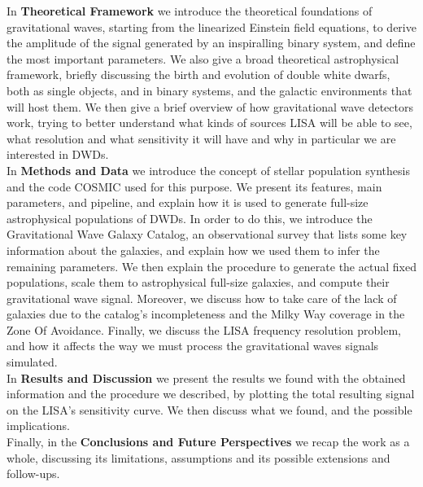 In \textbf{Theoretical Framework} we introduce the theoretical foundations of gravitational waves, starting from the linearized Einstein field equations, to derive the amplitude of the signal generated by an inspiralling binary system, and define the most important parameters.
We also give a broad theoretical astrophysical framework, briefly discussing the birth and evolution of double white dwarfs, both as single objects, and in binary systems, and the galactic environments that will host them.
We then give a brief overview of how gravitational wave detectors work, trying to better understand what kinds of sources LISA will be able to see, what resolution and what sensitivity it will have and why in particular we are interested in DWDs.
\vspace{2mm}\\
In \textbf{Methods and Data} we introduce the concept of stellar population synthesis and the code COSMIC used for this purpose.
We present its features, main parameters, and pipeline, and explain how it is used to generate full-size astrophysical populations of DWDs.
In order to do this, we introduce the Gravitational Wave Galaxy Catalog, an observational survey that lists some key information about the galaxies, and explain how we used them to infer the remaining parameters.
We then explain the procedure to generate the actual fixed populations, scale them to astrophysical full-size galaxies, and compute their gravitational wave signal. 
Moreover, we discuss how to take care of the lack of galaxies due to the catalog's incompleteness and the Milky Way coverage in the Zone Of Avoidance.
Finally, we discuss the LISA frequency resolution problem, and how it affects the way we must process the gravitational waves signals simulated.\vspace{2mm}\\
In \textbf{Results and Discussion} we present the results we found with the obtained information and the procedure we described, by plotting the total resulting signal on the LISA's sensitivity curve.
We then discuss what we found, and the possible implications. \vspace{2mm}\\
Finally, in the \textbf{Conclusions and Future Perspectives} we recap the work as a whole, discussing its limitations, assumptions and its possible extensions and follow-ups.
